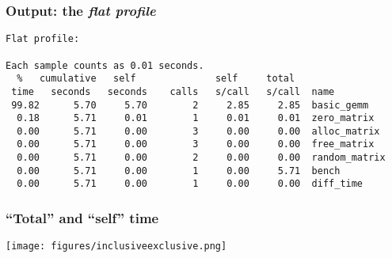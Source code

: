 \documentclass[dvipsnames,presentation,aspectratio=169,14pt]{beamer}
\begin{document}
\begin{frame}[fragile]
  \frametitle{Output: the \emph{flat profile}}
\begin{verbatim}
Flat profile:

Each sample counts as 0.01 seconds.
  %   cumulative   self              self     total
 time   seconds   seconds    calls   s/call   s/call  name
 99.82      5.70     5.70        2     2.85     2.85  basic_gemm
  0.18      5.71     0.01        1     0.01     0.01  zero_matrix
  0.00      5.71     0.00        3     0.00     0.00  alloc_matrix
  0.00      5.71     0.00        3     0.00     0.00  free_matrix
  0.00      5.71     0.00        2     0.00     0.00  random_matrix
  0.00      5.71     0.00        1     0.00     5.71  bench
  0.00      5.71     0.00        1     0.00     0.00  diff_time
\end{verbatim}
\end{frame}

\begin{frame}
  \frametitle{``Total'' and ``self'' time}
  \begin{center}
    \texttt{[image: figures/inclusiveexclusive.png]}
  \end{center}
\end{frame}
\end{document}

